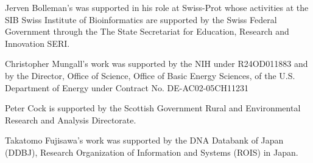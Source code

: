 \documentclass[10pt]{bmc_article}
\newenvironment{bmcformat}{\begin{raggedright}\baselineskip20pt\sloppy\setboolean{publ}{false}}{\end{raggedright}\baselineskip20pt\sloppy}
\begin{document}
\begin{bmcformat}
Jerven Bolleman's was supported in his role at Swiss-Prot whose activities at the SIB Swiss Institute of Bioinformatics are supported by the Swiss Federal Government through the The State Secretariat for Education, Research and Innovation SERI.

Christopher Mungall's work was supported by the NIH under R24OD011883 and by the Director, Office of Science, Office of Basic Energy Sciences, of the U.S. Department of Energy under Contract No. DE-AC02-05CH11231

Peter Cock is supported by the Scottish Government Rural and Environmental Research and Analysis Directorate.

Takatomo Fujisawa's work was supported by the DNA Databank of Japan (DDBJ), Research Organization of Information and Systems (ROIS) in Japan.

\newpage
{
   }     %
  
\end{bmcformat}
\end{document}
